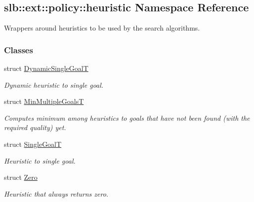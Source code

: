\hypertarget{namespaceslb_1_1ext_1_1policy_1_1heuristic}{}\subsection{slb\+:\+:ext\+:\+:policy\+:\+:heuristic Namespace Reference}
\label{namespaceslb_1_1ext_1_1policy_1_1heuristic}


Wrappers around heuristics to be used by the search algorithms.  


\subsubsection*{Classes}
\begin{DoxyCompactItemize}
\item 
struct \hyperlink{structslb_1_1ext_1_1policy_1_1heuristic_1_1DynamicSingleGoalT}{Dynamic\+Single\+GoalT}
\begin{DoxyCompactList}\small\item\em Dynamic heuristic to single goal. \end{DoxyCompactList}\item 
struct \hyperlink{structslb_1_1ext_1_1policy_1_1heuristic_1_1MinMultipleGoalsT}{Min\+Multiple\+GoalsT}
\begin{DoxyCompactList}\small\item\em Computes minimum among heuristics to goals that have not been found (with the required quality) yet. \end{DoxyCompactList}\item 
struct \hyperlink{structslb_1_1ext_1_1policy_1_1heuristic_1_1SingleGoalT}{Single\+GoalT}
\begin{DoxyCompactList}\small\item\em Heuristic to single goal. \end{DoxyCompactList}\item 
struct \hyperlink{structslb_1_1ext_1_1policy_1_1heuristic_1_1Zero}{Zero}
\begin{DoxyCompactList}\small\item\em Heuristic that always returns zero. \end{DoxyCompactList}\end{DoxyCompactItemize}
